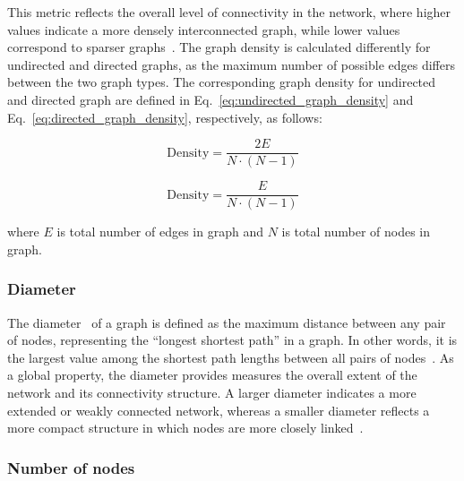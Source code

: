 \documentclass[pdflatex,sn-mathphys-num]{sn-jnl}%
\theoremstyle{thmstyleone}%
\theoremstyle{thmstyletwo}%
\theoremstyle{thmstylethree}%
\begin{document}
This metric reflects the overall level of connectivity in the network, where higher values indicate a more densely interconnected graph, while lower values correspond to sparser graphs~\cite{newman2010}. The graph density is calculated differently for undirected and directed graphs, as the maximum number of possible edges differs between the two graph types. The corresponding graph density for undirected and directed graph are defined in Eq.~\ref{eq:undirected_graph_density} and Eq.~\ref{eq:directed_graph_density}, respectively, as follows:


\begin{figure}[ht]
\centering
\begin{minipage}{0.48\textwidth}
\begin{equation}
\mathrm{Density} = \frac{2E}{N \cdot (N - 1)}
\label{eq:undirected_graph_density}
\end{equation}
\centering
\end{minipage}
\hfill
\begin{minipage}{0.48\textwidth}
\begin{equation}
\mathrm{Density} = \frac{E}{N \cdot (N - 1)}
\label{eq:directed_graph_density}
\end{equation}
\centering
\end{minipage}
\end{figure}

where $E$ is total number of edges in graph and $N$ is total number of nodes in graph.

\subsubsection*{Diameter}\label{subsubsec:diameter}

The diameter~\cite{BarabasiNetworkScience} of a graph is defined as the maximum distance between any pair of nodes, representing the ``longest shortest path'' in a graph.
In other words, it is the largest value among the shortest path lengths between all pairs of nodes~\cite{staudt2015networkit,CRESCENZI201384}.
As a global property, the diameter provides measures the overall extent of the network and its connectivity structure.
A larger diameter indicates a more extended or weakly connected network, whereas a smaller diameter reflects a more compact structure in which nodes are more closely linked~\cite{newman2010}.



\subsubsection*{Number of nodes}\label{subsubsec:num_nodes}
\end{document}
